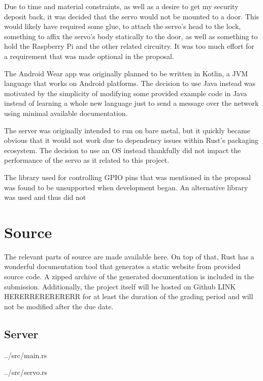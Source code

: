 \documentclass[a4paper]{article}
\begin{document}
Due to time and material constraints, as well as a desire to get my security deposit back, it was decided that the servo would not be mounted to a door.
This would likely have required some glue, to attach the servo's head to the lock, something to affix the servo's body statically to the door, as well as something to hold the Raspberry Pi and the other related circuitry.
It was too much effort for a requirement that was made optional in the proposal.

The Android Wear app was originally planned to be written in Kotlin, a JVM language that works on Android platforms.
The decision to use Java instead was motivated by the simplicity of modifying some provided example code in Java instead of learning a whole new language just to send a message over the network using minimal available documentation.

The server was originally intended to run on bare metal, but it quickly became obvious that it would not work due to dependency issues within Rust's packaging ecosystem.
The decision to use an OS instead thankfully did not impact the performance of the servo as it related to this project.

The library used for controlling GPIO pins that was mentioned in the proposal was found to be unsupported when development began.
An alternative library was used and thus did not 


\section{Source}\label{sec:source}
The relevant parts of source are made available here.
On top of that, Rust has a wonderful documentation tool that generates a static website from provided source code.
A zipped archive of the generated documentation is included in the submission.
Additionally, the project itself will be hosted on Github LINK HERERRERERERERR for at least the duration of the grading period and will not be modified after the due date.

\subsection{Server}\label{subsec:server}


{../src/main.rs}


{../src/servo.rs}
\end{document}
